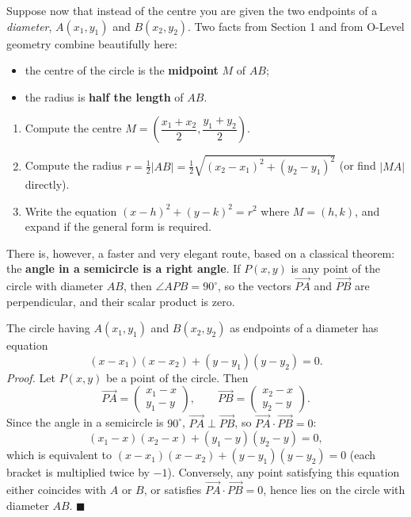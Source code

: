 \documentclass[11pt]{article}
\newcounter{popsec}
\newcounter{popsub}
\newcommand{\courssub}[1]{%
  \stepcounter{popsub}%
  \par\vspace{9pt}\noindent{\popxbold\fontsize{11.5}{13}\selectfont\color{popink}{\color{poporange}\thepopsec.\thepopsub}\hspace{6pt}#1}\par\nopagebreak\vspace{4pt}
}
\begin{document}
\courssub{Circle on a Given Diameter}

Suppose now that instead of the centre you are given the two endpoints of a \emph{diameter}, $A(x_1,y_1)$ and $B(x_2,y_2)$. Two facts from Section 1 and from O-Level geometry combine beautifully here:
\begin{itemize}
\item the centre of the circle is the \textbf{midpoint} $M$ of $AB$;
\item the radius is \textbf{half the length} of $AB$.
\end{itemize}

\begin{methode}
\begin{enumerate}
\item Compute the centre $M = \left(\dfrac{x_1+x_2}{2}, \dfrac{y_1+y_2}{2}\right)$.
\item Compute the radius $r = \tfrac{1}{2}|AB| = \tfrac{1}{2}\sqrt{(x_2-x_1)^2+(y_2-y_1)^2}$ (or find $|MA|$ directly).
\item Write the equation $(x - h)^2 + (y - k)^2 = r^2$ where $M=(h,k)$, and expand if the general form is required.
\end{enumerate}
\end{methode}

There is, however, a faster and very elegant route, based on a classical theorem: the \textbf{angle in a semicircle is a right angle}. If $P(x,y)$ is any point of the circle with diameter $AB$, then $\angle APB = 90^\circ$, so the vectors $\vec{PA}$ and $\vec{PB}$ are perpendicular, and their scalar product is zero.

\begin{propriete}
The circle having $A(x_1,y_1)$ and $B(x_2,y_2)$ as endpoints of a diameter has equation
\[ (x - x_1)(x - x_2) + (y - y_1)(y - y_2) = 0. \]
\emph{Proof.} Let $P(x,y)$ be a point of the circle. Then
\[ \vec{PA} = \begin{pmatrix} x_1 - x \\ y_1 - y \end{pmatrix}, \qquad \vec{PB} = \begin{pmatrix} x_2 - x \\ y_2 - y \end{pmatrix}. \]
Since the angle in a semicircle is $90^\circ$, $\vec{PA} \perp \vec{PB}$, so $\vec{PA}\cdot\vec{PB} = 0$:
\[ (x_1-x)(x_2-x) + (y_1-y)(y_2-y) = 0, \]
which is equivalent to $(x-x_1)(x-x_2) + (y-y_1)(y-y_2) = 0$ (each bracket is multiplied twice by $-1$). Conversely, any point satisfying this equation either coincides with $A$ or $B$, or satisfies $\vec{PA}\cdot\vec{PB}=0$, hence lies on the circle with diameter $AB$. $\blacksquare$
\end{propriete}
\end{document}
